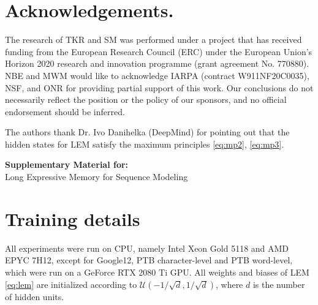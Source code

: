 \documentclass{article} \usepackage{iclr2022_conference,times}
\begin{document}
\clearpage

\section*{Acknowledgements.} The research of TKR and SM was performed under a project that has received funding from the European Research Council (ERC) under the European Union’s Horizon 2020 research and innovation programme (grant agreement No. 770880). NBE and MWM would like to
acknowledge IARPA (contract W911NF20C0035), NSF, and ONR for providing partial support of this work. Our conclusions do not necessarily reflect the position or the policy of our sponsors, and no official endorsement should be inferred. 

The authors thank Dr. Ivo Danihelka (DeepMind) for pointing out that the hidden states for LEM satisfy the maximum principles \eqref{eq:mp2}, \eqref{eq:mp3}.








\appendix
\newpage
\begin{center}
{\bf Supplementary Material for:}\\
Long Expressive Memory for Sequence Modeling
\end{center}
\section{Training details}
\label{app:training_details}
All experiments were run on CPU, namely Intel Xeon Gold 5118 and AMD EPYC 7H12, except for Google12, PTB character-level and PTB word-level, which were run on a GeForce RTX 2080 Ti GPU. All weights and biases of LEM \eqref{eq:lem} are initialized according to $\mathcal{U}(-1/\sqrt{d},1/\sqrt{d})$, where $d$ is the number of hidden units. 
\end{document}
